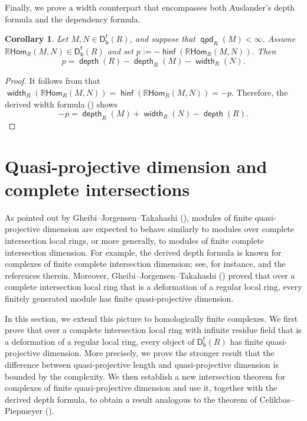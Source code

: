\documentclass[10pt, a4paper,reqno]{amsart}
\newtheorem{cor}[cor]{Corollary}
\theoremstyle{definition}
\theoremstyle{remark}
\numberwithin{equation}{thm}
\def\depth{\operatorname{\mathsf{depth}}}
\def\width{\operatorname{\mathsf{width}}}
\def\Dfb{\mathsf{D^f_b}}
\def\rHom{\mathbb{R}\mathsf{Hom}}
\def\hinf{\operatorname{\mathsf{hinf}}}
\def\qpd{\operatorname{\mathsf{qpd}}}
\begin{document}
Finally, we prove a width counterpart that encompasses both Auslander's depth formula and the dependency formula.

\begin{cor}
Let $M,N\in\Dfb(R)$, and suppose that $\qpd_R(M)<\infty$.
Assume $\rHom_R(M,N)\in\Dfb(R)$ and set $p := -\hinf(\rHom_R(M,N))$.
Then
\[
p = \depth(R) - \depth_R(M) - \width_R(N). 
\]
\end{cor}

\begin{proof}
It follows from \cite[Proposition 16.2.5]{CFH} that $\width_R(\rHom_R(M,N)) = \hinf(\rHom_R(M,N)) = -p$.
Therefore, the derived width formula () shows
\[
-p = \depth_R(M) + \width_R(N) - \depth(R).
\]
\end{proof}


\section{Quasi-projective dimension and complete intersections}

As pointed out by Gheibi--Jorgensen--Takahashi (\cite{GJT}), modules of finite quasi-projective dimension are expected to behave similarly to modules over complete intersection local rings, or more generally, to modules of finite complete intersection dimension. 
For example, the derived depth formula is known for complexes of finite complete intersection dimension; see, for instance, \cite{CJ2} and the references therein.
Moreover, Gheibi--Jorgensen--Takahashi (\cite[Corollary 3.8]{GJT}) proved that over a complete intersection local ring that is a deformation of a regular local ring, every finitely generated module has finite quasi-projective dimension. 

In this section, we extend this picture to homologically finite complexes.
We first prove that over a complete intersection local ring with infinite residue field that is a deformation of a regular local ring, every object of $\Dfb(R)$ has finite quasi-projective dimension. 
More precisely, we prove the stronger result that the difference between quasi-projective length and quasi-projective dimension is bounded by the complexity. 
We then establish a new intersection theorem for complexes of finite quasi-projective dimension and use it, together with the derived depth formula, to obtain a result analogous to the theorem of Celikbas--Piepmeyer (\cite{CP}).
\end{document}

